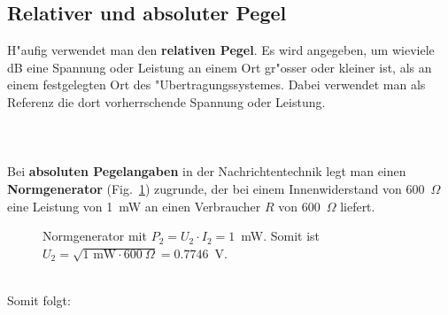 {\newpage
\subsection{Relativer  und absoluter Pegel } 
H"aufig verwendet man den
{\bf relativen Pegel}. Es wird angegeben, um wieviele dB eine Spannung oder
Leistung an einem Ort gr"osser oder kleiner ist, als an einem
festgelegten Ort des "Ubertragungssystemes. Dabei verwendet man als
Referenz die dort vorherrschende Spannung oder Leistung.\\~\\
\\~\\
Bei {\bf absoluten Pegelangaben} in der Nachrichtentechnik legt man einen
{\bf Normgenerator} (Fig.~\ref{GRU09}) zugrunde, der bei einem
Innenwiderstand von 600~$\Omega$ eine Leistung von 1~mW an einen
Verbraucher $R$ von 600~$\Omega$ liefert.\\
\begin{figure}[htb]
   \vspace*{-1mm}
   \begin{center}
        \caption{Normgenerator mit $P_2=U_2\cdot I_2=1$~mW. Somit ist $U_2=\sqrt{1\text{~mW}\cdot 600~\Omega}=0.7746$~V.}\label{GRU09}
  \end{center} \vspace*{-5mm}
\end{figure} \\
\nit  Somit folgt:\\~\\
}
